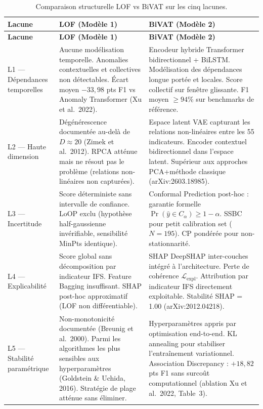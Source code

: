 \documentclass[12pt,a4paper]{article}
\begin{document}
\begin{longtable}{p{3cm}p{5.5cm}p{6cm}}
\caption{Comparaison structurelle LOF vs BiVAT sur les cinq lacunes.}
\label{tab:lof-bivat}\\
\toprule
\textbf{Lacune} & \textbf{LOF (Modèle 1)} & \textbf{BiVAT (Modèle 2)} \\
\midrule
\endfirsthead
\toprule
\textbf{Lacune} & \textbf{LOF (Modèle 1)} & \textbf{BiVAT (Modèle 2)} \\
\midrule
\endhead
\bottomrule\endlastfoot

L1 --- Dépendances temporelles &
Aucune modélisation temporelle. Anomalies contextuelles et collectives
non détectables. Écart moyen $-33{,}98$ pts F1 vs Anomaly Transformer
(Xu et al.\ 2022). &
Encodeur hybride Transformer bidirectionnel + BiLSTM. Modélisation des
dépendances longue portée et locales. Score collectif sur fenêtre glissante.
F1 moyen $\geq 94$\% sur benchmarks de référence. \\
\midrule

L2 --- Haute dimension &
Dégénérescence documentée au-delà de $D \approx 20$ (Zimek et al.\ 2012).
RPCA atténue mais ne résout pas le problème (relations non-linéaires
non capturées). &
Espace latent VAE capturant les relations non-linéaires entre les 55
indicateurs. Encoder contextuel bidirectionnel dans l'espace latent.
Supérieur aux approches PCA+méthode classique (arXiv:2603.18985). \\
\midrule

L3 --- Incertitude &
Score déterministe sans intervalle de confiance. LoOP exclu (hypothèse
half-gaussienne invérifiable, sensibilité MinPts identique). &
Conformal Prediction post-hoc : garantie formelle
$\Pr(\hat{y} \in C_\alpha) \geq 1-\alpha$. SSBC pour petit calibration set
($N=195$). CP pondérée pour non-stationnarité. \\
\midrule

L4 --- Explicabilité &
Score global sans décomposition par indicateur IFS. Feature Bagging
insuffisant. SHAP post-hoc approximatif (LOF non différentiable). &
SHAP DeepSHAP inter-couches intégré à l'architecture. Perte de cohérence
$\mathcal{L}_{\mathrm{expl}}$. Attribution par indicateur IFS directement
exploitable. Stabilité SHAP = 1.00 (arXiv:2012.04218). \\
\midrule

L5 --- Stabilité paramétrique &
Non-monotonicité documentée (Breunig et al.\ 2000). Parmi les algorithmes
les plus sensibles aux hyperparamètres (Goldstein \& Uchida, 2016). Stratégie
de plage atténue sans éliminer. &
Hyperparamètres appris par optimisation end-to-end. KL annealing pour
stabiliser l'entraînement variationnel. Association Discrepancy : $+18{,}82$
pts F1 sans surcoût computationnel (ablation Xu et al.\ 2022, Table~3). \\
\end{longtable}
\end{document}

